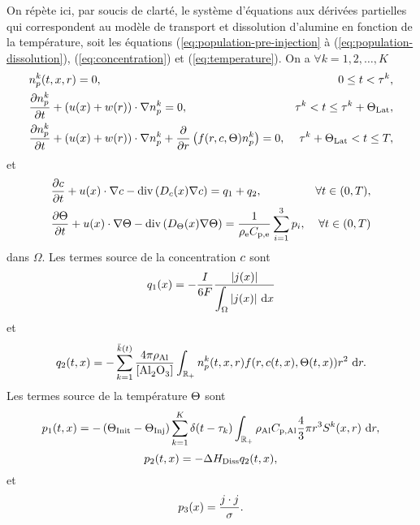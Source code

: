 On répète ici, par soucis de clarté, le système d'équations aux
dérivées partielles qui correspondent au modèle de transport et
dissolution d'alumine en fonction de la température, soit les
équations (\ref{eq:population-pre-injection} à
(\ref{eq:population-dissolution}), (\ref{eq:concentration}) et
(\ref{eq:temperature}). On a $\forall k = 1, 2, \dots, K$
\begin{align}
  & n_p^k(t, x, r) = 0,
  & 0\leq t < \tau^k,\label{eq:mdl-eq-1}\\
%
  & \frac{\partial n_p^k}{\partial t} + \parent{u(x) + w(r)}\cdot \nabla  n_p^k = 0,
  & \tau^k < t \leq \tau^k + \tlat,\label{eq:mdl-eq-2}\\
%
  & \frac{\partial n_p^k}{\partial t} + \parent{u(x) + w(r)}\cdot \nabla  n_p^k + \frac{\partial }{\partial r}\parent{f(r, \concentration, \temperature)n_p^k} = 0,
  & \tau^k + \tlat < t \leq \tend,\label{eq:mdl-eq-3}
\end{align}
et
\begin{align}
  & \frac{\partial \concentration}{\partial t} + u(x)\cdot\nabla \concentration - \div\parent{\cdiffusivity(x) \nabla \concentration} = q_1 + q_2,
  & \forall t\in (0, T),\label{eq:mdl-eq-4}\\
%
  & \frac{\partial \temperature}{\partial t} + u(x)\cdot\nabla\temperature - \div\parent{\electrolytetdiff(x)\nabla \temperature} = \frac{1}{\electrolytedensity\electrolytehc}\sum_{i = 1}^{3}p_i,
  & \forall t\in(0, T)\label{eq:mdl-eq-5}
\end{align}
dans $\Omega$. Les termes source de la concentration $c$ sont
\begin{equation}
  q_1(x) = -\frac{I}{6\faraday} %
  \frac{\abs{j(x)}}{\displaystyle\int_\Omega\abs{j(x)}\intd{x}}
\end{equation}
et
\begin{equation}
  q_2(t, x) = -\sum_{k = 1}^{\bar
    k(t)}\frac{4\pi\aluminadensity}{[\ce{Al2O3}]}\int_{\rplus}n_p^k(t,
  x, r)f(r, \concentration(t, x), \temperature(t, x))r^2\,\intd{r}.
\end{equation}
Les termes source de la température $\Theta$ sont
\begin{equation}
  p_1(t, x) = -\left( \Theta_\text{Init}-\Theta_\text{Inj} \right)\sum_{k = 1}^{K}\delta(t -
  \tau_k)\int_{\mathbb R_+}\rho_\mathrm{Al}C_{\mathrm{p,Al}}\frac{4}{3}\pi r^3 S^k(x, r)\,\,\mathrm dr,
\end{equation}
\begin{equation}
  p_2(t, x) = - \Delta H_\text{Diss} q_2(t, x),
\end{equation}
et
\begin{equation}
  p_3(x) = \frac{j\cdot j}{\sigma}.
\end{equation}

